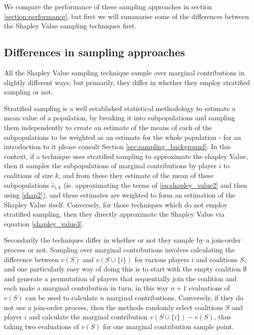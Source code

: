 We compare the performance of these sampling approaches in section \ref{section:performance}, but first we will summarise some of the differences between the Shapley Value sampling techniques first.


\subsection{Differences in sampling approaches}

All the Shapley Value sampling technique sample over marginal contributions in slightly different ways; but primarily, they differ in whether they employ stratified sampling or not.

Stratified sampling is a well established statistical methodology to estimate a mean value of a population, by breaking it into subpopulations and sampling them independently to create an estimate of the means of each of the subpopulations to be weighted as an estimate for the whole population - for an introduction to it please consult Section \ref{sec:sampling_background}.
In this context, if a technique uses stratified sampling to approximate the shapley Value, then it samples the subpopulations of marginal contributions by player $i$ to coalitions of size $k$, and from these they estimate of the mean of these subpopulations $\hat{v}_{i,k}$ (ie. approximating the terms of \eqref{eq:shapley_value2} and then using \eqref{shap2}), and these estimates are weighted to form an estimation of the Shapley Value itself.
Conversely, for those techniques which do not employ stratified sampling, then they directly approximate the Shapley Value via equation \eqref{shapley_value3}.

Secondarily the techniques differ in whether or not they sample by a join-order process or not. Sampling over marginal contributions involves calculating the difference between $v(S)$ and $v(S\cup\{i\})$ for various players $i$ and coalitions $S$, and one particularly easy way of doing this is to start with the empty coalition $\emptyset$ and generate a permutation of players that sequentially join the coalition and each make a marginal contribution in turn, in this way $n+1$ evaluations of $v(S)$ can be used to calculate $n$ marginal contributions.
Conversely, if they do not use a join-order process, then the methods randomly select coalitions $S$ and player $i$ and calculate the marginal contribution $v(S\cup\{i\}) - v(S)$, thus taking two evaluations of $v(S)$ for one marginal contribution sample point.


